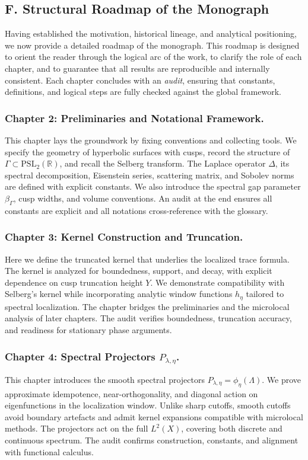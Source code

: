\subsection*{F. Structural Roadmap of the Monograph}

Having established the motivation, historical lineage, and analytical positioning,
we now provide a detailed roadmap of the monograph.
This roadmap is designed to orient the reader through the logical arc of the work,
to clarify the role of each chapter, and to guarantee
that all results are reproducible and internally consistent.
Each chapter concludes with an \emph{audit}, ensuring that constants, definitions,
and logical steps are fully checked against the global framework.

\subsubsection*{Chapter 2: Preliminaries and Notational Framework.}
This chapter lays the groundwork by fixing conventions and collecting tools.
We specify the geometry of hyperbolic surfaces with cusps,
record the structure of $\Gamma\subset \mathrm{PSL}_2(\mathbb{R})$,
and recall the Selberg transform.
The Laplace operator $\Delta$, its spectral decomposition,
Eisenstein series, scattering matrix, and Sobolev norms are defined with explicit constants.
We also introduce the spectral gap parameter $\beta_\Gamma$,
cusp widths, and volume conventions.
An audit at the end ensures all constants are explicit
and all notations cross-reference with the glossary.

\subsubsection*{Chapter 3: Kernel Construction and Truncation.}
Here we define the truncated kernel that underlies the localized trace formula.
The kernel is analyzed for boundedness, support, and decay,
with explicit dependence on cusp truncation height $Y$.
We demonstrate compatibility with Selberg’s kernel
while incorporating analytic window functions $h_\eta$ tailored to spectral localization.
The chapter bridges the preliminaries and the microlocal analysis of later chapters.
The audit verifies boundedness, truncation accuracy,
and readiness for stationary phase arguments.

\subsubsection*{Chapter 4: Spectral Projectors $P_{\lambda,\eta}$.}
This chapter introduces the smooth spectral projectors $P_{\lambda,\eta}=\phi_\eta(\Lambda)$.
We prove approximate idempotence, near-orthogonality,
and diagonal action on eigenfunctions in the localization window.
Unlike sharp cutoffs, smooth cutoffs avoid boundary artefacts
and admit kernel expansions compatible with microlocal methods.
The projectors act on the full $L^2(X)$, covering both discrete and continuous spectrum.
The audit confirms construction, constants, and alignment with functional calculus.

